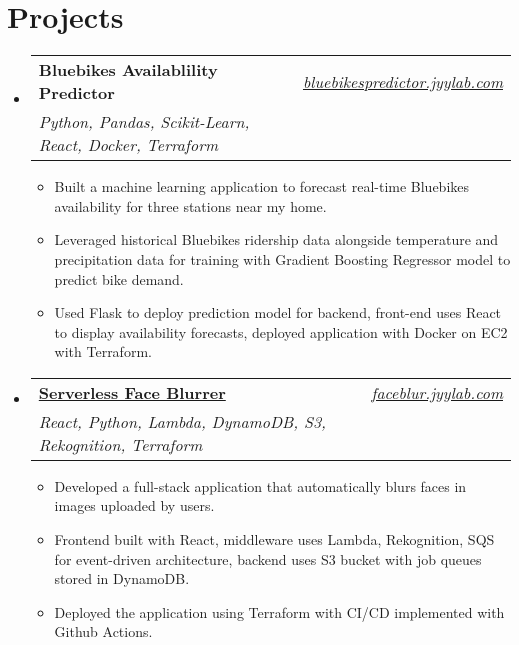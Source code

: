 \documentclass[letterpaper,11pt]{article}
\makeatletter
\newcommand{\resumeItem}[1]{
  \item\small{
    {#1 \vspace{-2pt}}
  }
}
\newcommand{\resumeSubheading}[4]{
  \vspace{-2pt}\item
    \begin{tabular*}{0.97\textwidth}[t]{l@{\extracolsep{\fill}}r}
      \textbf{#1} & #2 \\
      \textit{\small#3} & \textit{\small #4} \\
    \end{tabular*}\vspace{-7pt}
}
\newcommand{\resumeSubHeadingListStart}{\begin{itemize}[leftmargin=0.08in, label={}]}
\newcommand{\resumeSubHeadingListEnd}{\end{itemize}}
\newcommand{\resumeItemListStart}{\begin{itemize}[leftmargin=0.22in]}
\newcommand{\resumeItemListEnd}{\end{itemize}\vspace{-5pt}}
\makeatother
\begin{document}
\section{Projects}
    \resumeSubHeadingListStart
        \resumeSubheading
          {\textbf{{Bluebikes Availablility Predictor}}}{\emph{\href{https://bluebikespredictor.jyylab.com}{bluebikespredictor.jyylab.com}}}
          {Python, Pandas, Scikit-Learn, React, Docker, Terraform}{}
          \resumeItemListStart
            \resumeItem{Built a machine learning application to forecast real-time Bluebikes availability for three stations near my home.}
            \resumeItem{Leveraged historical Bluebikes ridership data alongside temperature and precipitation data for training with Gradient Boosting Regressor model to predict bike demand.}
            \resumeItem{Used Flask to deploy prediction model for backend, front-end uses React to display availability forecasts, deployed application with Docker on EC2 with Terraform.}
          \resumeItemListEnd
        \resumeSubheading
            {\textbf{\href{https://faceblur.jyylab.com}{Serverless Face Blurrer}}}{\emph{\href{https://faceblur.jyylab.com}{faceblur.jyylab.com}}}
            {React, Python, Lambda, DynamoDB, S3, Rekognition, Terraform}{}
            \resumeItemListStart
              \resumeItem{Developed a full-stack application that automatically blurs faces in images uploaded by users.}
              \resumeItem{Frontend built with React, middleware uses Lambda, Rekognition, SQS for event-driven architecture, backend uses S3 bucket with job queues stored in DynamoDB.}
              \resumeItem{Deployed the application using Terraform with CI/CD implemented with Github Actions.}
            \resumeItemListEnd
    \resumeSubHeadingListEnd
\end{document}
